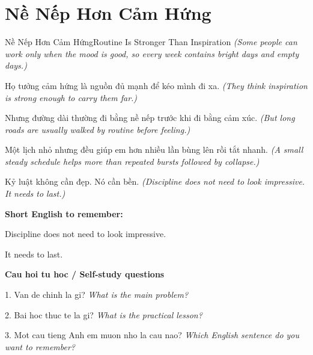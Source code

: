 \section{Nề Nếp Hơn Cảm Hứng}
\begin{truyen}{Nề Nếp Hơn Cảm Hứng}{Routine Is Stronger Than Inspiration}
\textit{(Some people can work only when the mood is good, so every week contains bright days and empty days.)}

Họ tưởng cảm hứng là nguồn đủ mạnh để kéo mình đi xa.
\textit{(They think inspiration is strong enough to carry them far.)}

Nhưng đường dài thường đi bằng nề nếp trước khi đi bằng cảm xúc.
\textit{(But long roads are usually walked by routine before feeling.)}

Một lịch nhỏ nhưng đều giúp em hơn nhiều lần bùng lên rồi tắt nhanh.
\textit{(A small steady schedule helps more than repeated bursts followed by collapse.)}

\end{truyen}

\begin{baihoc}
Kỷ luật không cần đẹp. Nó cần bền.
\textit{(Discipline does not need to look impressive. It needs to last.)}
\end{baihoc}

\begin{ghinhoanh}
\textbf{Short English to remember:}

Discipline does not need to look impressive.

It needs to last.

\end{ghinhoanh}

\begin{tuhocnhanh}
\textbf{Cau hoi tu hoc / Self-study questions}

1. Van de chinh la gi? \textit{What is the main problem?}

2. Bai hoc thuc te la gi? \textit{What is the practical lesson?}

3. Mot cau tieng Anh em muon nho la cau nao? \textit{Which English sentence do you want to remember?}
\end{tuhocnhanh}
\ngancach


